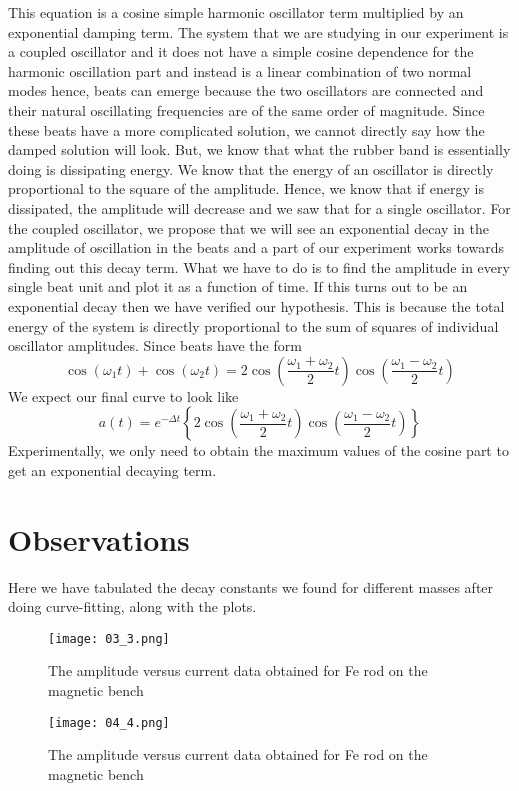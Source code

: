 This equation is a cosine simple harmonic oscillator term multiplied by an exponential damping term. The system that we are studying in our experiment is a coupled oscillator and it does not have a simple cosine dependence for the harmonic oscillation part and instead is a linear combination of two normal modes hence, beats can emerge because the two oscillators are connected and their natural oscillating frequencies are of the same order of magnitude. Since these beats have a more complicated solution, we cannot directly say how the damped solution will look. But, we know that what the rubber band is essentially doing is dissipating energy. We know that the energy of an oscillator is directly proportional to the square of the amplitude. Hence, we know that if energy is dissipated, the amplitude will decrease and we saw that for a single oscillator. For the coupled oscillator, we propose that we will see an exponential decay in the amplitude of oscillation in the beats and a part of our experiment works towards finding out this decay term. What we have to do is to find the amplitude in every single beat unit and plot it as a function of time. If this turns out to be an exponential decay then we have verified our hypothesis. This is because the total energy of the system is directly proportional to the sum of squares of individual oscillator amplitudes.
Since beats have the form 
\[\cos \left(\omega_{1} t\right)+\cos \left(\omega_{2} t\right)=2 \cos \left(\frac{\omega_{1}+\omega_{2}}{2} t\right) \cos \left(\frac{\omega_{1}-\omega_{2}}{2} t\right)\]
We expect our final curve to look like 
\[a(t)=e^{-\Delta t}\left\{  2 \cos \left(\frac{\omega_{1}+\omega_{2}}{2} t\right) \cos \left(\frac{\omega_{1}-\omega_{2}}{2} t\right)\right\}\]
Experimentally, we only need to obtain the maximum values of the cosine part to get an exponential decaying term.

\section{Observations}
Here we have tabulated the decay constants we found for different masses after doing curve-fitting, along with the plots.

\begin{figure}[H]
	\centering
	\texttt{[image: 03\_3.png]}
	\caption{The amplitude versus current data obtained for Fe rod on the magnetic bench}
	\label{fig:mb-fe-0}
\end{figure}

\begin{figure}[H]
	\centering
	\texttt{[image: 04\_4.png]}
	\caption{The amplitude versus current data obtained for Fe rod on the magnetic bench}
	\label{fig:mb-fe-0}
\end{figure}

